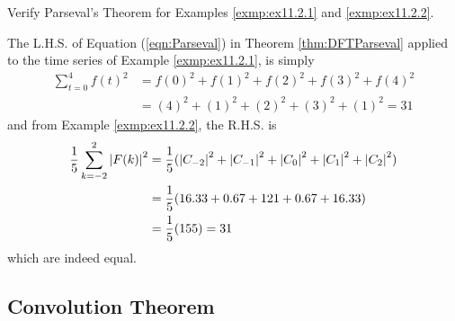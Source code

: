 \begin{exmp}
Verify Parseval's Theorem for Examples \ref{exmp:ex11.2.1} and \ref{exmp:ex11.2.2}.
\end{exmp}
\begin{solution}
The L.H.S. of Equation (\ref{eqn:Parseval}) in Theorem \ref{thm:DFTParseval} applied to the time series of Example \ref{exmp:ex11.2.1}, is simply
\begin{align*}
\sum_{t=0}^{4} f(t)^2 &= f(0)^2 + f(1)^2 + f(2)^2 + f(3)^2 + f(4)^2 \\
&= (4)^2 + (1)^2 + (2)^2 + (3)^2 + (1)^2 = 31    
\end{align*}
and from Example \ref{exmp:ex11.2.2}, the R.H.S. is
\begin{align*}
\frac{1}{5}\sum_{k=-2}^{2} \abs{F(k)}^2 &= \frac{1}{5}(\abs{C_{-2}}^2 + \abs{C_{-1}}^2 + \abs{C_{0}}^2 + \abs{C_{1}}^2 + \abs{C_{2}}^2) \\
&= \frac{1}{5}(16.33 + 0.67 + 121 + 0.67 + 16.33) \\
&= \frac{1}{5} (155) = 31
\end{align*}
which are indeed equal.
\end{solution}

\subsection{Convolution Theorem}

